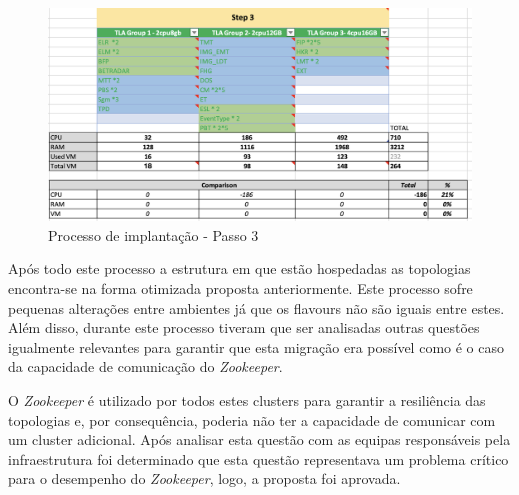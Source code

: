 \begin{figure}[H]
  \centerline{\includegraphics[scale=0.5]{media/content/analise/strat-3.png}}
  \caption{Processo de implantação - Passo 3}
  \label{strat-3}
\end{figure}

Após todo este processo a estrutura em que estão hospedadas as topologias encontra-se na forma
otimizada proposta anteriormente. Este processo sofre pequenas alterações entre ambientes já que 
os \glspl{flavour} não são iguais entre estes. Além disso, durante este processo tiveram que ser 
analisadas outras questões igualmente relevantes para garantir que esta migração era possível como 
é o caso da capacidade de comunicação do \textit{Zookeeper}.

O \textit{Zookeeper} é utilizado por todos estes \glspl{cluster} para garantir a resiliência das 
topologias e, por consequência, poderia não ter a capacidade de comunicar com um \gls{cluster}
adicional. Após analisar esta questão com as equipas responsáveis pela infraestrutura foi 
determinado que esta questão representava um problema crítico para o desempenho do 
\textit{Zookeeper}, logo, a proposta foi aprovada.

